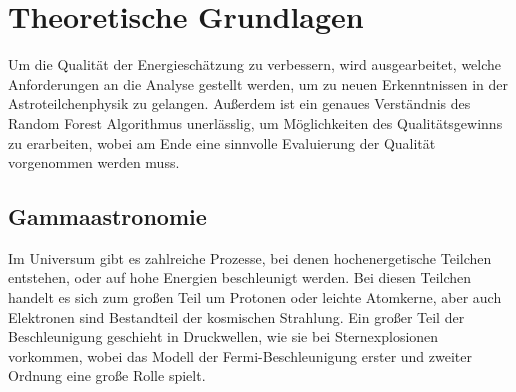 \chapter{Theoretische Grundlagen}

Um die Qualität der Energieschätzung zu verbessern, wird ausgearbeitet, welche Anforderungen an die Analyse gestellt
werden, um zu neuen Erkenntnissen in der Astroteilchenphysik zu gelangen.
Außerdem ist ein genaues Verständnis des Random Forest Algorithmus unerlässlig, um Möglichkeiten des Qualitätsgewinns zu erarbeiten,
wobei am Ende eine sinnvolle Evaluierung der Qualität vorgenommen werden muss.

\section{Gammaastronomie}
\label{sec:Gammaastronomie}

Im Universum gibt es zahlreiche Prozesse, bei denen hochenergetische Teilchen entstehen, oder auf hohe Energien beschleunigt werden.
Bei diesen Teilchen handelt es sich zum großen Teil um Protonen oder leichte Atomkerne, aber auch Elektronen
sind Bestandteil der kosmischen Strahlung.
Ein großer Teil der Beschleunigung geschieht in Druckwellen, wie sie bei Sternexplosionen vorkommen, wobei das Modell der
Fermi-Beschleunigung erster und zweiter Ordnung eine große Rolle spielt.
%


